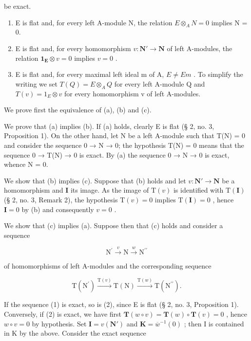 be exact.

\begin{enumerate}
\def\labelenumi{(\alph{enumi})}
\setcounter{enumi}{1}
\item
  E is flat and, for every left A-module N, the relation \(E \otimes_{A} N = 0\) implies N = 0.
\item
  E is flat and, for every homomorphism \(v: \mathbf{N}' \to \mathbf{N}\) of left A-modules, the relation \(\mathbf{1}_{\mathbf{E}} \otimes v = 0\) implies \(v = 0\) .
\item
  E is flat and, for every maximal left ideal m of A, \(E \neq Em\) . To simplify the writing we set \(T(Q) = E \otimes_{A} Q\) for every left A-module Q and \(T(v) = 1_{E} \otimes v\) for every homomorphism v of left A-modules.
\end{enumerate}

We prove first the equivalence of (a), (b) and (c).

We prove that (a) implies (b). If (a) holds, clearly E is flat (§ 2, no. 3, Proposition 1). On the other hand, let N be a left A-module such that T(N) = 0 and consider the sequence 0 → N → 0; the hypothesis T(N) = 0 means that the sequence 0 → T(N) → 0 is exact. By (a) the sequence 0 → N → 0 is exact, whence N = 0.

We show that (b) implies (c). Suppose that (b) holds and let \(v: \mathbf{N}' \to \mathbf{N}\) be a homomorphism and \(\mathbf{I}\) its image. As the image of \(\mathrm{T}(v)\) is identified with \(\mathrm{T}(\mathbf{I})\) (§ 2, no. 3, Remark 2), the hypothesis \(\mathrm{T}(v) = 0\) implies \(\mathrm{T}(\mathbf{I}) = 0\) , hence \(\mathbf{I} = 0\) by (b) and consequently \(v = 0\) .

We show that (c) implies (a). Suppose then that (c) holds and consider a sequence

\[
\mathrm{N} ^ {\prime} \xrightarrow {v} \mathrm{N} \xrightarrow {w} \mathrm{N} ^ {\prime \prime}\tag{1}
\]

of homomorphisms of left A-modules and the corresponding sequence

\[
\mathrm{T} \left(\mathrm{N} ^ {\prime}\right) \xrightarrow {\mathrm{T} (v)} \mathrm{T} (\mathrm{N}) \xrightarrow {\mathrm{T} (w)} \mathrm{T} \left(\mathrm{N} ^ {\prime \prime}\right).\tag{2}
\]

If the sequence (1) is exact, so is (2), since E is flat (§ 2, no. 3, Proposition 1). Conversely, if (2) is exact, we have first \(\mathbf{T}(w \circ v) = \mathbf{T}(w) \circ \mathbf{T}(v) = 0\) , hence \(w \circ v = 0\) by hypothesis. Set \(\mathbf{I} = v(\mathbf{N}')\) and \(\mathbf{K} = \overline{w}^{-1}(0)\) ; then I is contained in K by the above. Consider the exact sequence

